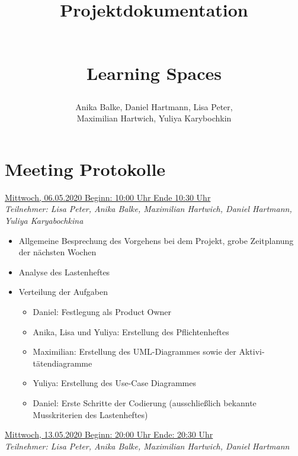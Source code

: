 \documentclass[a4paper,report,headsepline]{scrreprt}
\begin{document}
\title{ \begin{Huge}
\textbf{Projektdokumentation}
\end{Huge} \\  \dq Learning Spaces\dq}
\author{Anika Balke, Daniel Hartmann, Lisa Peter, \\ Maximilian Hartwich, Yuliya Karybochkin}

\maketitle


\tableofcontents
\clearpage



\chapter{Meeting Protokolle}
\underline{{\large Mittwoch, 06.05.2020 Beginn: 10:00 Uhr Ende 10:30 Uhr}}  \\
\textit{Teilnehmer: Lisa Peter, Anika Balke, Maximilian Hartwich, Daniel Hartmann, Yuliya Karyabochkina}

 \begin{itemize}
  \item Allgemeine Besprechung des Vorgehens bei dem Projekt, grobe Zeitplanung der nächsten Wochen
 \item Analyse des Lastenheftes
 \item Verteilung der Aufgaben
 
 \begin{itemize}
 \item Daniel: Festlegung als Product Owner
 \item Anika, Lisa und Yuliya: Erstellung des Pflichtenheftes
 \item Maximilian: Erstellung des UML-Diagrammes sowie der Aktivi-
 tätendiagramme
 \item Yuliya: Erstellung des Use-Case Diagrammes
 \item Daniel: Erste Schritte der Codierung (ausschließlich bekannte Musskriterien des Lastenheftes)
 
\end{itemize} 
\end{itemize}  
 \underline{{\large Mittwoch, 13.05.2020 Beginn: 20:00 Uhr Ende: 20:30 Uhr}}  \\
\textit{Teilnehmer: Lisa Peter, Anika Balke, Maximilian Hartwich, Daniel Hartmann}
\end{document}
